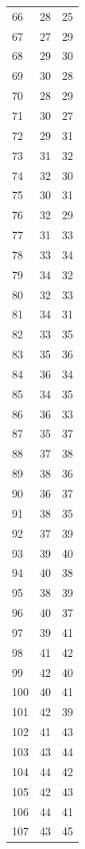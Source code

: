 \documentclass[a4paper,11pt]{article}
\begin{document}
\begin{center}
\begin{longtable}{|R{1.5cm}|R{1.5cm}|R{1.5cm}|}
   66 &   28 &   25 \\
   67 &   27 &   29 \\
   68 &   29 &   30 \\
   69 &   30 &   28 \\
   70 &   28 &   29 \\
   71 &   30 &   27 \\
   72 &   29 &   31 \\
   73 &   31 &   32 \\
   74 &   32 &   30 \\
   75 &   30 &   31 \\
   76 &   32 &   29 \\
   77 &   31 &   33 \\
   78 &   33 &   34 \\
   79 &   34 &   32 \\
   80 &   32 &   33 \\
   81 &   34 &   31 \\
   82 &   33 &   35 \\
   83 &   35 &   36 \\
   84 &   36 &   34 \\
   85 &   34 &   35 \\
   86 &   36 &   33 \\
   87 &   35 &   37 \\
   88 &   37 &   38 \\
   89 &   38 &   36 \\
   90 &   36 &   37 \\
   91 &   38 &   35 \\
   92 &   37 &   39 \\
   93 &   39 &   40 \\
   94 &   40 &   38 \\
   95 &   38 &   39 \\
   96 &   40 &   37 \\
   97 &   39 &   41 \\
   98 &   41 &   42 \\
   99 &   42 &   40 \\
  100 &   40 &   41 \\
  101 &   42 &   39 \\
  102 &   41 &   43 \\
  103 &   43 &   44 \\
  104 &   44 &   42 \\
  105 &   42 &   43 \\
  106 &   44 &   41 \\
  107 &   43 &   45 \\

\end{longtable}
\end{center}
\end{document}
